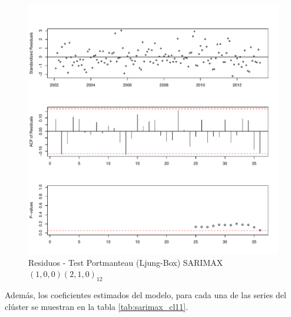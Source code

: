 \documentclass[12pt,oneside]{book}\usepackage[]{graphicx}\usepackage[]{color}
\makeatletter
\def\maxwidth{ %
  \ifdim\Gin@nat@width>\linewidth
    \linewidth
  \else
    \Gin@nat@width
  \fi
}
\newenvironment{knitrout}{}{} %
\theoremstyle{definition} %
\makeatother
\begin{document}
\begin{knitrout}
\color{fgcolor}\begin{figure}[h]

{\centering \includegraphics[width=\maxwidth]{figure/unnamed-chunk-97-1} 

}

\caption[Residuos - Test Portmanteau (Ljung-Box) SARIMAX$(1,0,0)(2,1,0)_{12}$]{Residuos - Test Portmanteau (Ljung-Box) SARIMAX$(1,0,0)(2,1,0)_{12}$}\label{fig:unnamed-chunk-97}
\end{figure}


\end{knitrout}


Además, los coeficientes estimados del modelo, para cada una de las series del clúster se muestran en la tabla \ref{tab:sarimax_cl11}.
\end{document}
